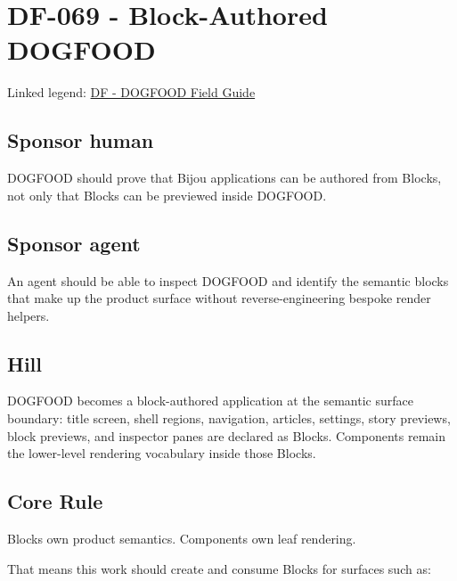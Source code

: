 \chapter{DF-069 - Block-Authored DOGFOOD}\label{record-109}

\smallskip

Linked legend: \href{https://github.com/flyingrobots/bijou/blob/1853ad902f6bf219326409e7f743a5a1d6517dbc/docs/legends/DF-dogfood-field-guide.md}{DF - DOGFOOD Field Guide}

\section{Sponsor human}\label{record-109-sponsor-human}

DOGFOOD should prove that Bijou applications can be authored from Blocks, not only that Blocks can be previewed inside DOGFOOD.

\section{Sponsor agent}\label{record-109-sponsor-agent}

An agent should be able to inspect DOGFOOD and identify the semantic blocks that make up the product surface without reverse-engineering bespoke render helpers.

\section{Hill}\label{record-109-hill}

DOGFOOD becomes a block-authored application at the semantic surface boundary: title screen, shell regions, navigation, articles, settings, story previews, block previews, and inspector panes are declared as Blocks. Components remain the lower-level rendering vocabulary inside those Blocks.

\section{Core Rule}\label{record-109-core-rule}

Blocks own product semantics. Components own leaf rendering.

That means this work should create and consume Blocks for surfaces such as:

